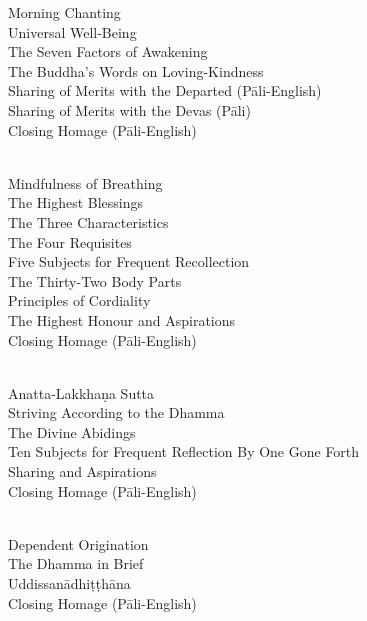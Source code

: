 \begin{center}
  Morning Chanting\\
  Universal Well-Being\\
  The Seven Factors of Awakening\\
  The Buddha’s Words on Loving-Kindness\\
  Sharing of Merits with the Departed (Pāli-English)\\
  Sharing of Merits with the Devas (Pāli)\\
  Closing Homage (Pāli-English)\\

  \bigskip
  \clearpage

  {\libertinusFont\selectfont\textbf{\textsc{}}}\\

  Mindfulness of Breathing\\
  The Highest Blessings\\
  The Three Characteristics\\
  The Four Requisites\\
  Five Subjects for Frequent Recollection\\
  The Thirty-Two Body Parts\\
  Principles of Cordiality\\
  The Highest Honour and Aspirations\\
  Closing Homage (Pāli-English)\\

  \bigskip

  {\libertinusFont\selectfont\textbf{\textsc{}}}\\

  Anatta-Lakkhaṇa Sutta\\
  Striving According to the Dhamma\\
  The Divine Abidings\\
  Ten Subjects for Frequent Reflection By One Gone Forth\\
  Sharing and Aspirations\\
  Closing Homage (Pāli-English)\\

  \bigskip
  \clearpage

  {\libertinusFont\selectfont\textbf{\textsc{}}}\\

  Dependent Origination\\
  The Dhamma in Brief\\
  Uddissanādhiṭṭhāna\\
  Closing Homage (Pāli-English)\\


\end{center}
